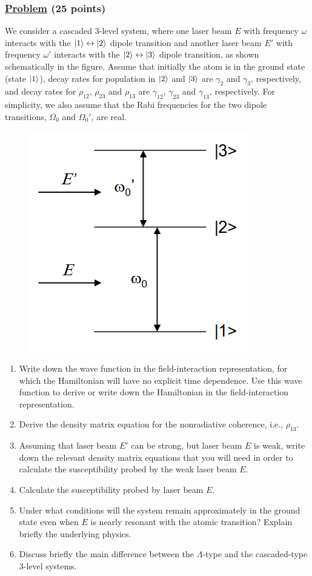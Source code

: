 \documentclass[12pt]{article}
\begin{document}
\subsubsection*{\underline{Problem} (25 points)}
We consider a cascaded 3-level system, where one laser beam $E$ with frequency $\omega$ interacts with the $\ket{1}\leftrightarrow\ket{2}$ dipole transition and another laser beam $E'$ with frequency $\omega'$ interacts with the $\ket{2}\leftrightarrow\ket{3}$ dipole transition, as shown schematically in the figure.
Assume that initially the atom is in the ground state (state $\ket{1}$), decay rates for population in $\ket{2}$ and $\ket{3}$ are $\gamma_2$ and $\gamma_3$, respectively, and decay rates for $\rho_{12}$, $\rho_{23}$ and $\rho_{13}$ are $\gamma_{12}$, $\gamma_{23}$ and $\gamma_{13}$, respectively.
For simplicity, we also assume that the Rabi frequencies for the two dipole transitions, $\Omega_0$ and $\Omega_0'$, are real.
\begin{figure}[h]
    \centering
    \includegraphics[scale=.75]{cascade.png}
\end{figure}
\begin{enumerate}[label=(\alph*)]
    \item Write down the wave function in the field-interaction representation, for which the Hamiltonian will have no explicit time dependence. Use this wave function to derive or write down the Hamiltonian in the field-interaction representation.
    \item Derive the density matrix equation for the nonradiative coherence, i.e., $\rho_{13}$.
    \item Assuming that laser beam $E'$ can be strong, but laser beam $E$ is weak, write down the relevant density matrix equations that you will need in order to calculate the susceptibility probed by the weak laser beam $E$.
    \item Calculate the susceptibility probed by laser beam $E$.
    \item Under what conditions will the system remain approximately in the ground state even when $E$ is nearly resonant with the atomic transition? Explain briefly the underlying physics.
    \item Discuss briefly the main difference between the $\Lambda$-type and the cascaded-type 3-level systems.
\end{enumerate}
\end{document}

